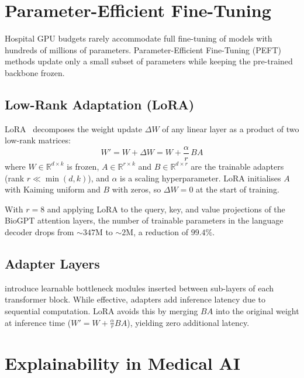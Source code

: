 \section{Parameter-Efficient Fine-Tuning}
\label{sec:lit_peft}

Hospital GPU budgets rarely accommodate full fine-tuning of models with
hundreds of millions of parameters. Parameter-Efficient Fine-Tuning (PEFT)
methods update only a small subset of parameters while keeping the
pre-trained backbone frozen.

\subsection{Low-Rank Adaptation (LoRA)}
\label{subsec:lora}

LoRA~\citep{hu2021lora} decomposes the weight update $\Delta W$ of any
linear layer as a product of two low-rank matrices:
\begin{equation}
  W' = W + \Delta W = W + \frac{\alpha}{r}\, B A
  \label{eq:lora}
\end{equation}
where $W \in \mathbb{R}^{d \times k}$ is frozen, $A \in \mathbb{R}^{r \times k}$
and $B \in \mathbb{R}^{d \times r}$ are the trainable adapters (rank $r \ll \min(d,k)$),
and $\alpha$ is a scaling hyperparameter. LoRA initialises $A$ with Kaiming
uniform and $B$ with zeros, so $\Delta W = 0$ at the start of training.

With $r=8$ and applying LoRA to the query, key, and value projections of
the BioGPT attention layers, the number of trainable parameters in the
language decoder drops from ${\sim}347$M to ${\sim}2$M, a reduction of
$99.4\%$.

\subsection{Adapter Layers}
\label{subsec:adapters}

\cite{houlsby2019adapter} introduce learnable bottleneck modules inserted
between sub-layers of each transformer block. While effective, adapters
add inference latency due to sequential computation. LoRA avoids this by
merging $BA$ into the original weight at inference time
($W' = W + \frac{\alpha}{r}BA$), yielding zero additional latency.

\section{Explainability in Medical AI}
\label{sec:lit_xai}

